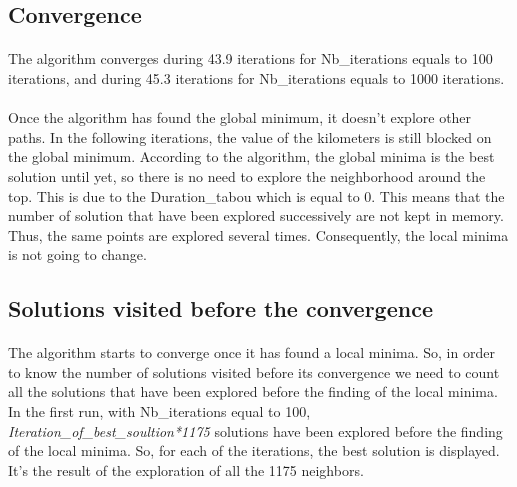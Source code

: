 \documentclass[12pt,oneside,a4paper]{article}
\begin{document}
\subsection{Convergence}
\paragraph{}
    The algorithm converges during 43.9 iterations for Nb\_iterations equals to 100 iterations, and during 45.3 iterations for Nb\_iterations equals to 1000 iterations. 
\paragraph{}
    Once the algorithm has found the global minimum, it doesn't explore other paths. In the following iterations, the value of the kilometers is still blocked on the global minimum. 
    According to the algorithm, the global minima is the best solution until yet, so there is no need to explore the neighborhood around the top.  
    This is due to the Duration\_tabou which is equal to 0. This means that the number of solution that have been explored successively are not kept in memory. 
    Thus, the same points are explored several times. Consequently, the local minima is not going to change.

\newpage
\subsection{Solutions visited before the convergence}
\paragraph{}
    The algorithm starts to converge once it has found a local minima.
    So, in order to know the number of solutions visited before its convergence we need to count all the solutions 
    that have been explored before the finding of the local minima. 
    In the first run, with Nb\_iterations equal to 100, \textit{Iteration\_of\_best\_soultion*1175} solutions have been explored before the finding of the local minima. 
    So, for each of the iterations, the best solution is displayed. It’s the result of the exploration of all the 1175 neighbors.
\end{document}

